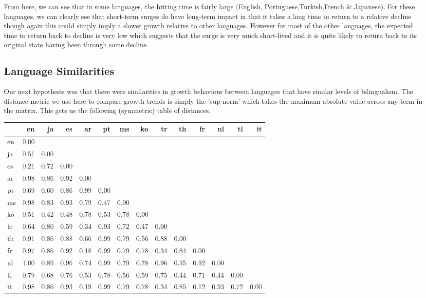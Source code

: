 \documentclass[12pt]{article}
\begin{document}
\vspace{0.5cm}
\FloatBarrier
From here, we can see that in some languages, the hitting time is fairly large (English, Portuguese,Turkish,French \& Japanese). For these languages, we can clearly see that short-term surges do have long-term impact in that it takes a long time to return to a relative decline though again this could simply imply a slower growth relative to other languages. However for most of the other languages, the expected time to return back to decline is very low which suggests that the surge is very much short-lived and it is quite likely to return back to its original state having been through some decline.
\subsection{Language Similarities}
Our next hypothesis was that there were similarities in growth behaviour between languages that have similar levels of bilingualism. The distance metric we use here to compare growth trends is simply the 'sup-norm' which takes the maximum absolute value across any term in the matrix. This gets us the following (symmetric) table of distances.\\
\begin{table}[hbtp]
\begin{center}
\begin{tabular}{lrrrrrrrrrrrrr}
\toprule
{} &    en &    ja &    es &    ar &    pt &    ms &    ko &    tr &    th &    fr &    nl &    tl &    it \\
\midrule
en &  0.00 &  & & &   &  &   &   &   &  &  &   &   \\
ja &  0.51 &  0.00 &&&&&&&&&&&\\
es &  0.21 &  0.72 &  0.00 &&&&&&&&&&   \\
ar &  0.98 &  0.86 &  0.92 &  0.00 &&&&&&&&& \\
pt &  0.69 &  0.60 &  0.86 &  0.99 &  0.00 &&&&&&&& \\
ms &  0.98 &  0.83 &  0.93 &  0.79 &  0.47 &  0.00 &&&&&&& \\
ko &  0.51 &  0.42 &  0.48 &  0.78 &  0.53 &  0.78 &  0.00 &&&&&& \\
tr &  0.64 &  0.80 &  0.59 &  0.34 &  0.93 &  0.72 &  0.47 &  0.00 &&&&& \\
th &  0.91 &  0.86 &  0.88 &  0.66 &  0.99 &  0.79 &  0.56 &  0.88 &  0.00 &&&& \\
fr &  0.97 &  0.86 &  0.92 &  0.18 &  0.99 &  0.79 &  0.78 &  0.34 &  0.84 &  0.00 &&& \\
nl &  1.00 &  0.89 &  0.96 &  0.74 &  0.99 &  0.79 &  0.78 &  0.96 &  0.35 &  0.92 &  0.00 && \\
tl &  0.79 &  0.68 &  0.76 &  0.53 &  0.78 &  0.56 &  0.59 &  0.75 &  0.44 &  0.71 &  0.44 &  0.00 &   \\
it &  0.98 &  0.86 &  0.93 &  0.19 &  0.99 &  0.79 &  0.78 &  0.34 &  0.85 &  0.12 &  0.93 &  0.72 &  0.00 \\
\bottomrule
\end{tabular}
\end{center}
\end{table}
\end{document}
